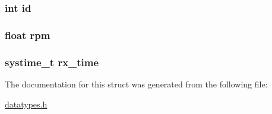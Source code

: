 \subsubsection[{id}]{\setlength{\rightskip}{0pt plus 5cm}int id}\label{structcan__status__msg_a7441ef0865bcb3db9b8064dd7375c1ea}
\hypertarget{structcan__status__msg_a25e39b399c2a11f0d76e42ab8241a910}{}
\subsubsection[{rpm}]{\setlength{\rightskip}{0pt plus 5cm}float rpm}\label{structcan__status__msg_a25e39b399c2a11f0d76e42ab8241a910}
\hypertarget{structcan__status__msg_a2cbed3b3239da5fee2814530c2815fdb}{}
\subsubsection[{rx\+\_\+time}]{\setlength{\rightskip}{0pt plus 5cm}systime\+\_\+t rx\+\_\+time}\label{structcan__status__msg_a2cbed3b3239da5fee2814530c2815fdb}


The documentation for this struct was generated from the following file\+:\begin{DoxyCompactItemize}
\item 
\hyperlink{datatypes_8h}{datatypes.\+h}\end{DoxyCompactItemize}

